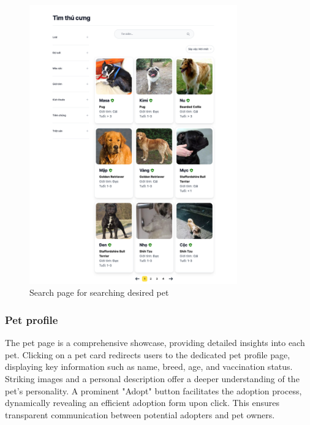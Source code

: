 \begin{figure}[H]
    \centering
    \includegraphics[width=0.8\textwidth]{Figures/UI/search_ui.png}
    \caption{Search page for searching desired pet}
\end{figure}


\subsubsection{Pet profile}

The pet page is a comprehensive showcase, providing detailed insights into each pet. Clicking on a pet card redirects users to the dedicated pet profile page, displaying key information such as name, breed, age, and vaccination status. Striking images and a personal description offer a deeper understanding of the pet's personality. A prominent "Adopt" button facilitates the adoption process, dynamically revealing an efficient adoption form upon click. This ensures transparent communication between potential adopters and pet owners.

